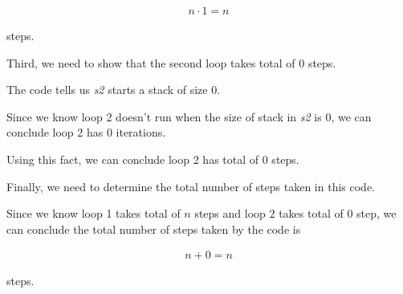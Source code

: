 \documentclass[12pt]{article}
\begin{document}
\begin{enumerate}[a.]
    \begin{align}
        n \cdot 1 = n
    \end{align}

    steps.

    \bigskip

    Third, we need to show that the second loop takes total of 0 steps.

    \bigskip

    The code tells us \textit{s2} starts a stack of size 0.

    \bigskip

    Since we know loop 2 doesn't run when the size of stack in \textit{s2} is 0,
    we can conclude loop 2 has 0 iterations.

    \bigskip

    Using this fact, we can conclude loop 2 has total of 0 steps.

    \bigskip

    Finally, we need to determine the total number of steps taken in this code.

    \bigskip

    Since we know loop 1 takes total of $n$ steps and loop 2 takes total of 0 step, we can
    conclude the total number of steps taken by the code is

    \begin{align}
        n + 0 = n
    \end{align}

    steps.

    \bigskip











\end{enumerate}
\end{document}
